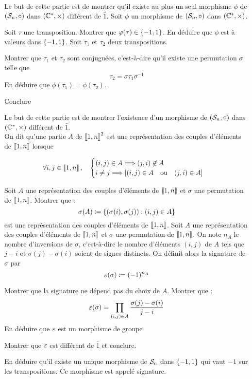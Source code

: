 \documentclass{magnolia}
\begin{document}
\begin{questions}
\question Le but de cette partie est de montrer qu'il existe au plus un
  seul morphisme $\phi$ de $(\mathcal{S}_{n},\circ)$ dans $(\mathbb{C}^*,\times)$
  différent de $\bar{1}$.
  Soit $\phi$ un morphisme de $(\mathcal{S}_{n},\circ)$ dans $(\mathbb{C}^*,\times)$.
  \begin{questions}
  \question Soit $\tau$ une transposition. Montrer que $\varphi(\tau)\in
    \left\{-1,1\right\}$.
  \question En déduire que $\phi$ est à valeurs dans $\left\{-1,1\right\}$.
  \question Soit $\tau_1$ et $\tau_2$ deux transpositions.
    \begin{questions}
    \question Montrer que $\tau_1$ et $\tau_2$ sont conjuguées, c'est-à-dire
      qu'il existe une permutation $\sigma$ telle que
      $$\tau_2 = \sigma \tau_1 \sigma^{-1}$$
    \question En déduire que $\phi(\tau_1)=\phi(\tau_2)$.
    \end{questions}
  \question Conclure
  \end{questions}
\question Le but de cette partie est de montrer l'existence d'un morphisme de
  $(\mathcal{S}_{n},\circ)$ dans $(\mathbb{C}^*,\times)$ différent de $\bar{1}$.\\
  On dit qu'une partie $A$ de $\left\llbracket 1,n\right\rrbracket^2$ est une représentation
  des couples d'éléments de $\left\llbracket 1,n\right\rrbracket$ lorsque

  $$\forall i,j \in\left\llbracket 1,n\right\rrbracket
  ,\quad
  \begin{cases}
  (i,j)\in A \Longrightarrow (j,i)\not\in A\\
  i\neq j \Longrightarrow \left[(i,j)\in A \quad\text{ou}\quad (j,i)\in A\right]
  \end{cases}
  $$
  \begin{questions}
  \question Soit $A$ une représentation des couples d'éléments de
    $\left\llbracket 1,n\right\rrbracket$ et $\sigma$ une permutation de
    $\left\llbracket 1,n\right\rrbracket$. Montrer que : 
    $$\sigma(A)\coloneqq\left\{ (\sigma(i),\sigma(j)) : (i,j)\in A \right\}$$
    est une représentation des couples d'éléments de $\left\llbracket 1,n\right\rrbracket$.
  \question Soit $A$ une représentation des couples d'éléments de
    $\left\llbracket 1,n\right\rrbracket$ et $\sigma$ une permutation de
    $\left\llbracket 1,n\right\rrbracket$. On note $n_A$ le nombre d'inversions de $\sigma$,
    c'est-à-dire le nombre d'éléments $(i,j)$ de $A$ tels que $j-i$ et
    $\sigma(j)-\sigma(i)$ soient de signes distincts. On définit alors
    la signature de $\sigma$ par
    $$\signature(\sigma)\defeq(-1)^{n_A}$$
    \begin{questions}
    \question Montrer que la signature ne dépend pas du choix de $A$.
    \question Montrer que :
      $$\signature(\sigma)=\prod_{(i,j)\in A}
                         \frac{\sigma(j)-\sigma(i)}{j-i}$$
    \question En déduire que $\signature$ est un morphisme de groupe
    \end{questions}
  \question Montrer que $\signature$ est différent de $\bar{1}$ et conclure.
  \end{questions}
\question En déduire qu'il existe un unique morphisme de $\mathcal{S}_{n}$ dans
  $\left\{-1,1\right\}$ qui vaut $-1$ sur les transpositions. Ce morphisme est
  appelé signature.
\end{questions}


\end{document}
